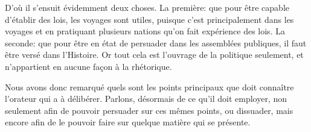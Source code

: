D'où il s'ensuit évidemment deux choses. La première: que pour être capable d'établir des lois, les voyages sont utiles,
puisque c'est principalement dans les voyages et en pratiquant plusieurs nations qu'on fait expérience des lois. La seconde:
que pour être en état de persuader dans les assemblées publiques, il faut être versé dans l'Histoire. Or tout cela est
l'ouvrage de la politique seulement, et n'appartient en aucune façon à la rhétorique.

Nous avons donc remarqué quels sont les points principaux que doit connaître l'orateur qui a à délibérer. Parlons, désormais
de ce qu'il doit employer, non seulement afin de pouvoir persuader sur ces mêmes points, ou dissuader, mais encore afin de
le pouvoir faire sur quelque matière qui se présente.